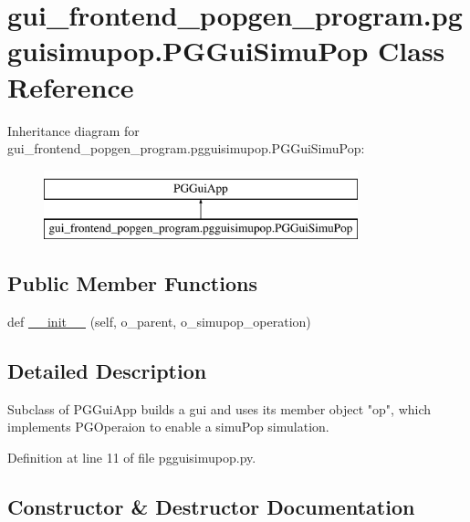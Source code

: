\hypertarget{classgui__frontend__popgen__program_1_1pgguisimupop_1_1PGGuiSimuPop}{}\section{gui\+\_\+frontend\+\_\+popgen\+\_\+program.\+pgguisimupop.\+P\+G\+Gui\+Simu\+Pop Class Reference}
\label{classgui__frontend__popgen__program_1_1pgguisimupop_1_1PGGuiSimuPop}
Inheritance diagram for gui\+\_\+frontend\+\_\+popgen\+\_\+program.\+pgguisimupop.\+P\+G\+Gui\+Simu\+Pop\+:\begin{figure}[H]
\begin{center}
\leavevmode
\includegraphics[height=2.000000cm]{classgui__frontend__popgen__program_1_1pgguisimupop_1_1PGGuiSimuPop}
\end{center}
\end{figure}
\subsection*{Public Member Functions}
\begin{DoxyCompactItemize}
\item 
def \hyperlink{classgui__frontend__popgen__program_1_1pgguisimupop_1_1PGGuiSimuPop_ae07df9c15703aef165688e29ace1c6ac}{\+\_\+\+\_\+init\+\_\+\+\_\+} (self, o\+\_\+parent, o\+\_\+simupop\+\_\+operation)
\end{DoxyCompactItemize}


\subsection{Detailed Description}
\begin{DoxyVerb}Subclass of PGGuiApp builds a gui and uses its member object "op", which
implements PGOperaion to enable a  simuPop simulation.
\end{DoxyVerb}
 

Definition at line 11 of file pgguisimupop.\+py.



\subsection{Constructor \& Destructor Documentation}

